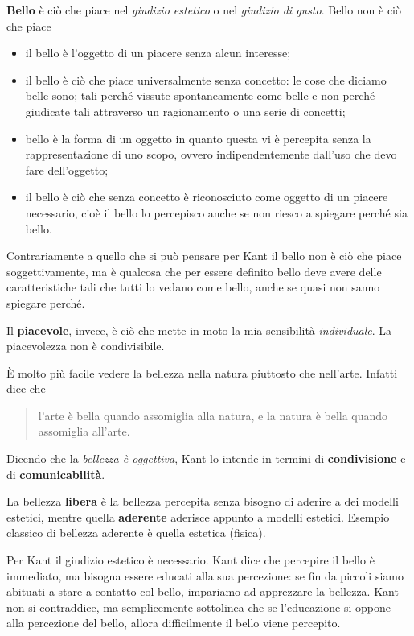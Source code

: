\documentclass[a4paper, twoside, titlepage]{book}
\newcommand{\citazione}[1]{%
  \begin{quotation}
  #1
  \end{quotation}}
\begin{document}
\textbf{Bello} è ciò che piace nel \textit{giudizio estetico} o nel \textit{giudizio di gusto}. Bello non è ciò che piace
\begin{itemize}
\item il bello è l'oggetto di un piacere senza alcun interesse;
\item il bello è ciò che piace universalmente senza concetto: le cose che diciamo belle sono; tali perché vissute spontaneamente come belle e non perché giudicate tali attraverso un ragionamento o una serie di concetti;
\item bello è la forma di un oggetto in quanto questa vi è percepita senza la rappresentazione di uno scopo, ovvero indipendentemente dall'uso che devo fare dell'oggetto;
\item il bello è ciò che senza concetto è riconosciuto come oggetto di un piacere necessario, cioè il bello lo percepisco anche se non riesco a spiegare perché sia bello.
\end{itemize}

Contrariamente a quello che si può pensare per Kant il bello non è ciò che piace soggettivamente, ma è qualcosa che per essere definito bello deve avere delle caratteristiche tali che tutti lo vedano come bello, anche se quasi non sanno spiegare perché.

Il \textbf{piacevole}, invece, è ciò che mette in moto la mia sensibilità \textit{individuale}. La piacevolezza non è condivisibile.

È molto più facile vedere la bellezza nella natura piuttosto che nell'arte. Infatti dice che
\citazione{l'arte è bella quando assomiglia alla natura, e la natura è bella quando assomiglia all'arte.}

Dicendo che la \textit{bellezza è oggettiva}, Kant lo intende in termini di \textbf{condivisione} e di \textbf{comunicabilità}.

La bellezza \textbf{libera} è la bellezza percepita senza bisogno di aderire a dei modelli estetici, mentre quella \textbf{aderente} aderisce appunto a modelli estetici. Esempio classico di bellezza aderente è quella estetica (fisica).

Per Kant il giudizio estetico è necessario. Kant dice che percepire il bello è immediato, ma bisogna essere educati alla sua percezione: se fin da piccoli siamo abituati a stare a contatto col bello, impariamo ad apprezzare la bellezza. Kant non si contraddice, ma semplicemente sottolinea che se l'educazione si oppone alla percezione del bello, allora difficilmente il bello viene percepito.
\end{document}
